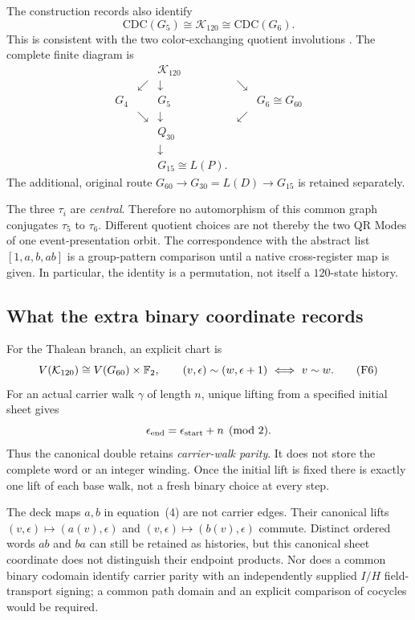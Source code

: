 The construction records also identify
\begin{equation}
\mathrm{CDC}(G_5)\cong\mathcal K_{120}\cong\mathrm{CDC}(G_6).
\tag{F5}\label{eq:commondouble}
\end{equation}
This is consistent with the two color-exchanging quotient involutions \citep{c412038names}. The complete finite diagram is
\[
\begin{array}{ccccc}
&&\mathcal K_{120}&&\\
&\swarrow&\downarrow&\searrow&\\
G_4&&G_5&&G_6\cong G_{60}\\
&\searrow&\downarrow&\swarrow&\\
&&Q_{30}&&\\
&&\downarrow&&\\
&&G_{15}\cong L(P).&&
\end{array}
\]
The additional, original route $G_{60}\to G_{30}=L(D)\to G_{15}$ is retained separately.

The three $\tau_i$ are \emph{central}. Therefore no automorphism of this common graph conjugates $\tau_5$ to $\tau_6$. Different quotient choices are not thereby the two QR Modes of one event-presentation orbit. The correspondence with the abstract list $[1,a,b,ab]$ is a group-pattern comparison until a native cross-register map is given. In particular, the identity is a permutation, not itself a $120$-state history.

\subsection*{What the extra binary coordinate records}
For the Thalean branch, an explicit chart is
\begin{equation}
V(\mathcal K_{120})\cong V(G_{60})\times\mathbb F_2,
\qquad (v,\epsilon)\sim(w,\epsilon+1)
\ \Longleftrightarrow\ v\sim w.
\tag{F6}\label{eq:kparity}
\end{equation}
For an actual carrier walk $\gamma$ of length $n$, unique lifting from a specified initial sheet gives
\[
\epsilon_{\rm end}=\epsilon_{\rm start}+n\pmod2.
\]
Thus the canonical double retains \emph{carrier-walk parity}. It does not store the complete word or an integer winding. Once the initial lift is fixed there is exactly one lift of each base walk, not a fresh binary choice at every step.

The deck maps $a,b$ in equation~(4) are not carrier edges. Their canonical lifts $(v,\epsilon)\mapsto(a(v),\epsilon)$ and $(v,\epsilon)\mapsto(b(v),\epsilon)$ commute. Distinct ordered words $ab$ and $ba$ can still be retained as histories, but this canonical sheet coordinate does not distinguish their endpoint products. Nor does a common binary codomain identify carrier parity with an independently supplied $I/H$ field-transport signing; a common path domain and an explicit comparison of cocycles would be required.

